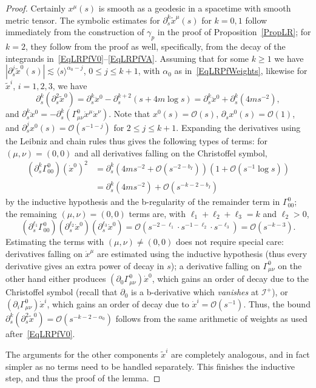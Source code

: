 \documentclass[reqno,11pt,letterpaper]{amsart}
\numberwithin{equation}{section}
\numberwithin{figure}{section}
\theoremstyle{definition}
\theoremstyle{remark}
\newcommand{\mc}{\mathcal}
\newcommand{\cO}{\mc O}
\newcommand{\ms}{\mathscr}
\newcommand{\scri}{\ms I}
\newcommand{\la}{\langle}
\newcommand{\pa}{\partial}
\newcommand{\ra}{\rangle}
\newcommand{\wt}{\widetilde}
\begin{document}
\begin{proof}
  Certainly $x^\mu(s)$ is smooth as a geodesic in a spacetime with smooth metric tensor. The symbolic estimates for $\pa_s^k\wt x^\mu(s)$ for $k=0,1$ follow immediately from the construction of $\gamma_p$ in the proof of Proposition~\ref{PropLR}; for $k=2$, they follow from the proof as well, specifically, from the decay of the integrands in~\eqref{EqLRPfV0}--\eqref{EqLRPfVA}. Assuming that for some $k\geq 1$ we have $|\pa_s^j\wt x^0(s)|\lesssim\la s\ra^{\alpha_0-j}$, $0\leq j\leq k+1$, with $\alpha_0$ as in~\eqref{EqLRPfWeights}, likewise for $\wt x^i$, $i=1,2,3$, we have
  \[
    \pa_s^k(\pa_s^2\wt x^0) = \pa_s^k\ddot x^0 - \pa_s^{k+2}(s+4 m\log s) = \pa_s^k\ddot x^0 + \pa_s^k(4 m s^{-2}),
  \]
  and $\pa_s^k\ddot x^0=-\pa_s^k(\Gamma^0_{\mu\nu}\dot x^\mu\dot x^\nu)$. Note that $x^0(s)=\cO(s)$, $\pa_s x^0(s)=\cO(1)$, and $\pa_s^j x^0(s)=\cO(s^{-1-j})$ for $2\leq j\leq k+1$. Expanding the derivatives using the Leibniz and chain rules thus gives the following types of terms: for $(\mu,\nu)=(0,0)$ and all derivatives falling on the Christoffel symbol,
  \begin{align*}
    (\pa_s^k\Gamma^0_{0 0})(\dot x^0)^2&=\pa_s^k(4 m s^{-2}+\cO(s^{-2-b_I}))(1+\cO(s^{-1}\log s)) \\
      &=\pa_s^k(4 m s^{-2}) + \cO(s^{-k-2-b_I})
  \end{align*}
  by the inductive hypothesis and the b-regularity of the remainder term in $\Gamma^0_{0 0}$; the remaining $(\mu,\nu)=(0,0)$ terms are, with $\ell_1+\ell_2+\ell_3=k$ and $\ell_2>0$,
  \[
    (\pa_s^{\ell_1}\Gamma_{0 0}^0)(\pa_s^{\ell_2}\dot x^0)(\pa_s^{\ell_3}\dot x^0) = \cO(s^{-2-\ell_1}\cdot s^{-1-\ell_2}\cdot s^{-\ell_3}) = \cO(s^{-k-3}).
  \]
  Estimating the terms with $(\mu,\nu)\neq(0,0)$ does not require special care: derivatives falling on $\dot x^\mu$ are estimated using the inductive hypothesis (thus every derivative gives an extra power of decay in $s$); a derivative falling on $\Gamma_{\mu\nu}^0$ on the other hand either produces $(\pa_0\Gamma_{\mu\nu}^0)\dot x^0$, which gains an order of decay due to the Christoffel symbol (recall that $\pa_0$ is a b-derivative which \emph{vanishes} at $\scri^+$), or $(\pa_i\Gamma_{\mu\nu}^0)\dot x^i$, which gains an order of decay due to $\dot x^i=\cO(s^{-1})$. Thus, the bound $\pa_s^k(\pa_s^2\wt x^0)=\cO(s^{-k-2-\alpha_0})$ follows from the same arithmetic of weights as used after~\eqref{EqLRPfV0}.

  The arguments for the other components $\wt x^i$ are completely analogous, and in fact simpler as no terms need to be handled separately. This finishes the inductive step, and thus the proof of the lemma.
\end{proof}
\end{document}
